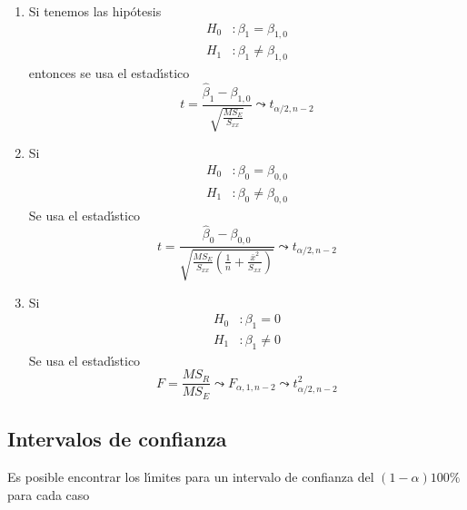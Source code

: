 \begin{enumerate}
\item Si tenemos las hip\'{o}tesis
\begin{align*}
H_{0}  &  :\beta_{1}=\beta_{1,0}\\
H_{1}  &  :\beta_{1}\neq\beta_{1,0}%
\end{align*}
entonces se usa el estad\'{\i}stico
\[
t=\frac{\hat{\beta}_{1}-\beta_{1,0}}{\sqrt{\frac{MS_{E}}{S_{xx}}}}\leadsto
t_{\alpha/2,n-2}%
\]

\item Si
\begin{align*}
H_{0}  &  :\beta_{0}=\beta_{0,0}\\
H_{1}  &  :\beta_{0}\neq\beta_{0,0}%
\end{align*}
Se usa el estad\'{\i}stico
\[
t=\frac{\hat{\beta}_{0}-\beta_{0,0}}{\sqrt{\frac{MS_{E}}{S_{xx}}\left(
\frac{1}{n}+\frac{\bar{x}^{2}}{S_{xx}}\right)  }}\leadsto t_{\alpha/2,n-2}%
\]

\item Si
\begin{align*}
H_{0}  &  :\beta_{1}=0\\
H_{1}  &  :\beta_{1}\neq0
\end{align*}
Se usa el estad\'{\i}stico
\[
F=\frac{MS_{R}}{MS_{E}}\leadsto F_{\alpha,1,n-2}\leadsto t_{\alpha/2,n-2}^{2}%
\]
\end{enumerate}

\subsection{Intervalos de confianza}

Es posible encontrar los l\'{\i}mites para un intervalo de confianza del
$\left(  1-\alpha\right)  100\%$ para cada caso

